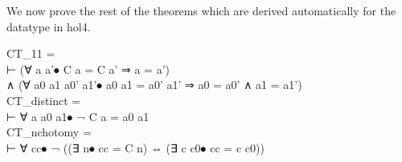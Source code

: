 
We now prove the rest of the theorems which are derived automatically for the datatype in hol4.

\begin{GFT}{}
\+\PrNL{}CT\_11\PrNN{} =\\
\+	⊢ (∀ a a'⦁ C a = C a' ⇒ a = a')\\
\+	∧ (∀ a0 a1 a0' a1'⦁ a0  a1 = a0'  a1' ⇒ a0 = a0' ∧ a1 = a1')\\
\+\PrNL{}CT\_distinct\PrNN{} =\\
\+	⊢ ∀ a a0 a1⦁ ¬ C a = a0  a1\\
\+\PrNL{}CT\_nchotomy\PrNN{} =\\
\+	⊢ ∀ cc⦁ ¬ ((∃ n⦁ cc = C n) ⇔ (∃ c c0⦁ cc = c  c0))\\
\end{GFT}



